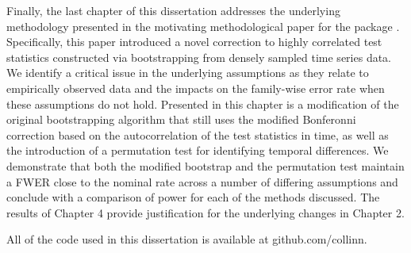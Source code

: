 Finally, the last chapter of this dissertation addresses the underlying methodology presented in the motivating methodological paper for the  package \citep{oleson2017detecting}. Specifically, this paper introduced a novel correction to highly correlated test statistics constructed via bootstrapping from densely sampled time series data. We identify a critical issue in the underlying assumptions as they relate to empirically observed data and the impacts on the family-wise error rate when these assumptions do not hold. Presented in this chapter is a modification of the original bootstrapping algorithm that still uses the modified Bonferonni correction based on the autocorrelation of the test statistics in time, as well as the introduction of a permutation test for identifying temporal differences. We demonstrate that both the modified bootstrap and the permutation test maintain a FWER close to the nominal rate across a number of differing assumptions and conclude with a comparison of power for each of the methods discussed. The results of Chapter 4 provide justification for the underlying changes in Chapter 2. 

All of the code used in this dissertation is available at github.com/collinn.


